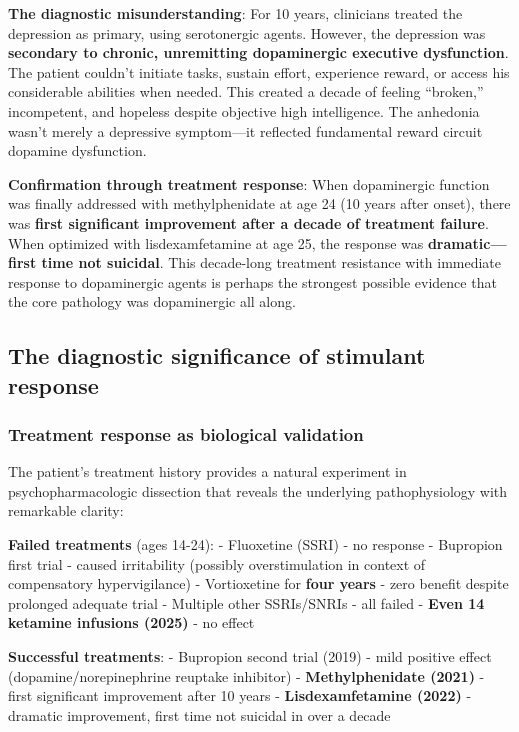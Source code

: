 \textbf{The diagnostic misunderstanding}: For 10 years, clinicians treated the depression as primary, using serotonergic agents. However, the depression was \textbf{secondary to chronic, unremitting dopaminergic executive dysfunction}. The patient couldn't initiate tasks, sustain effort, experience reward, or access his considerable abilities when needed. This created a decade of feeling ``broken,'' incompetent, and hopeless despite objective high intelligence. The anhedonia wasn't merely a depressive symptom---it reflected fundamental reward circuit dopamine dysfunction.

\textbf{Confirmation through treatment response}: When dopaminergic function was finally addressed with methylphenidate at age 24 (10 years after onset), there was \textbf{first significant improvement after a decade of treatment failure}. When optimized with lisdexamfetamine at age 25, the response was \textbf{dramatic---first time not suicidal}. This decade-long treatment resistance with immediate response to dopaminergic agents is perhaps the strongest possible evidence that the core pathology was dopaminergic all along.

\subsection{The diagnostic significance of stimulant response}\label{10a_trd_basis-the-diagnostic-significance-of-stimulant-response}

\subsubsection{Treatment response as biological validation}\label{10a_trd_basis-treatment-response-as-biological-validation}

The patient's treatment history provides a natural experiment in psychopharmacologic dissection that reveals the underlying pathophysiology with remarkable clarity:

\textbf{Failed treatments} (ages 14-24): - Fluoxetine (SSRI) - no response - Bupropion first trial - caused irritability (possibly overstimulation in context of compensatory hypervigilance) - Vortioxetine for \textbf{four years} - zero benefit despite prolonged adequate trial - Multiple other SSRIs/SNRIs - all failed - \textbf{Even 14 ketamine infusions (2025)} - no effect

\textbf{Successful treatments}: - Bupropion second trial (2019) - mild positive effect (dopamine/norepinephrine reuptake inhibitor) - \textbf{Methylphenidate (2021)} - first significant improvement after 10 years - \textbf{Lisdexamfetamine (2022)} - dramatic improvement, first time not suicidal in over a decade

